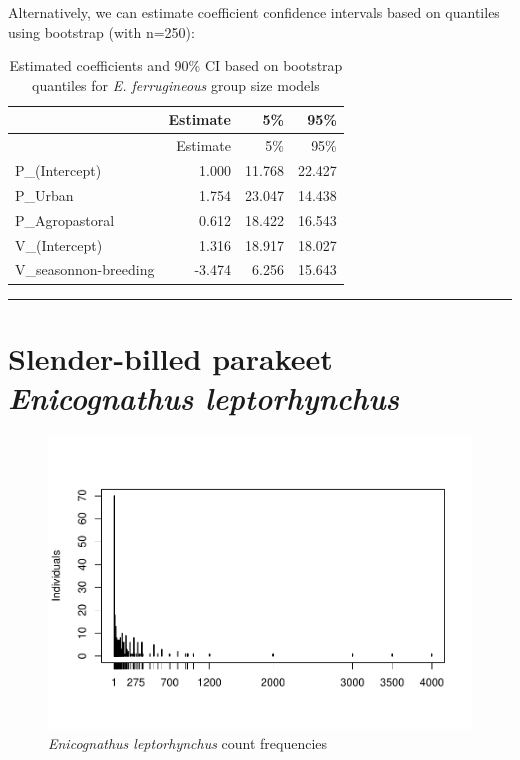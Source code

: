 \documentclass[]{article}
\begin{document}
Alternatively, we can estimate coefficient confidence intervals based on
quantiles using bootstrap (with n=250):

\begin{longtable}[]{@{}lrrr@{}}
\caption{Estimated coefficients and 90\% CI based on bootstrap quantiles
for \textit{E. ferrugineous} group size models}\tabularnewline
\toprule
& Estimate & 5\% & 95\%\tabularnewline
\midrule
\endfirsthead
\toprule
& Estimate & 5\% & 95\%\tabularnewline
\midrule
\endhead
P\_(Intercept) & 1.000 & 11.768 & 22.427\tabularnewline
P\_Urban & 1.754 & 23.047 & 14.438\tabularnewline
P\_Agropastoral & 0.612 & 18.422 & 16.543\tabularnewline
V\_(Intercept) & 1.316 & 18.917 & 18.027\tabularnewline
V\_seasonnon-breeding & -3.474 & 6.256 & 15.643\tabularnewline
\bottomrule
\end{longtable}

\begin{center}\rule{0.5\linewidth}{\linethickness}\end{center}

\section{\texorpdfstring{Slender-billed parakeet \emph{Enicognathus
leptorhynchus}}{Slender-billed parakeet Enicognathus leptorhynchus}}\label{slender-billed-parakeet-enicognathus-leptorhynchus}

\begin{figure}[H]
\includegraphics{Patagonia_parrots_density_analysis_files/figure-latex/unnamed-chunk-16-1} \caption{\textit{Enicognathus leptorhynchus} count frequencies}\label{fig:unnamed-chunk-16}
\end{figure}
\end{document}
